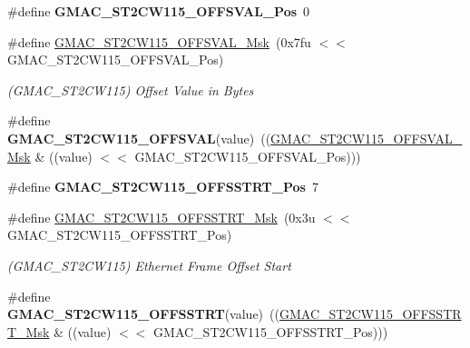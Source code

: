 \begin{DoxyCompactItemize}
\item 
\mbox{\label{group__SAME70__GMAC_ga09c5005c4fdbc41fdffe21a4d8cff012}} 
\#define {\bfseries G\+M\+A\+C\+\_\+\+S\+T2\+C\+W115\+\_\+\+O\+F\+F\+S\+V\+A\+L\+\_\+\+Pos}~0
\item 
\mbox{\label{group__SAME70__GMAC_ga8915a6df60c8f1c436c4851c3bc1a903}} 
\#define \mbox{\hyperlink{group__SAME70__GMAC_ga8915a6df60c8f1c436c4851c3bc1a903}{G\+M\+A\+C\+\_\+\+S\+T2\+C\+W115\+\_\+\+O\+F\+F\+S\+V\+A\+L\+\_\+\+Msk}}~(0x7fu $<$$<$ G\+M\+A\+C\+\_\+\+S\+T2\+C\+W115\+\_\+\+O\+F\+F\+S\+V\+A\+L\+\_\+\+Pos)
\begin{DoxyCompactList}\small\item\em (G\+M\+A\+C\+\_\+\+S\+T2\+C\+W115) Offset Value in Bytes \end{DoxyCompactList}\item 
\mbox{\label{group__SAME70__GMAC_ga343adf63bcdb9618f96d9dec4e4d792f}} 
\#define {\bfseries G\+M\+A\+C\+\_\+\+S\+T2\+C\+W115\+\_\+\+O\+F\+F\+S\+V\+AL}(value)~((\mbox{\hyperlink{group__SAMV71__GMAC_ga8915a6df60c8f1c436c4851c3bc1a903}{G\+M\+A\+C\+\_\+\+S\+T2\+C\+W115\+\_\+\+O\+F\+F\+S\+V\+A\+L\+\_\+\+Msk}} \& ((value) $<$$<$ G\+M\+A\+C\+\_\+\+S\+T2\+C\+W115\+\_\+\+O\+F\+F\+S\+V\+A\+L\+\_\+\+Pos)))
\item 
\mbox{\label{group__SAME70__GMAC_ga6ee2fbe1565cbacf9946df9fb4369632}} 
\#define {\bfseries G\+M\+A\+C\+\_\+\+S\+T2\+C\+W115\+\_\+\+O\+F\+F\+S\+S\+T\+R\+T\+\_\+\+Pos}~7
\item 
\mbox{\label{group__SAME70__GMAC_ga3c64c58bd0a7ba2c85555617269a0cf5}} 
\#define \mbox{\hyperlink{group__SAME70__GMAC_ga3c64c58bd0a7ba2c85555617269a0cf5}{G\+M\+A\+C\+\_\+\+S\+T2\+C\+W115\+\_\+\+O\+F\+F\+S\+S\+T\+R\+T\+\_\+\+Msk}}~(0x3u $<$$<$ G\+M\+A\+C\+\_\+\+S\+T2\+C\+W115\+\_\+\+O\+F\+F\+S\+S\+T\+R\+T\+\_\+\+Pos)
\begin{DoxyCompactList}\small\item\em (G\+M\+A\+C\+\_\+\+S\+T2\+C\+W115) Ethernet Frame Offset Start \end{DoxyCompactList}\item 
\mbox{\label{group__SAME70__GMAC_gaf8bf033e124aa922de6e49d29411a46c}} 
\#define {\bfseries G\+M\+A\+C\+\_\+\+S\+T2\+C\+W115\+\_\+\+O\+F\+F\+S\+S\+T\+RT}(value)~((\mbox{\hyperlink{group__SAMV71__GMAC_ga3c64c58bd0a7ba2c85555617269a0cf5}{G\+M\+A\+C\+\_\+\+S\+T2\+C\+W115\+\_\+\+O\+F\+F\+S\+S\+T\+R\+T\+\_\+\+Msk}} \& ((value) $<$$<$ G\+M\+A\+C\+\_\+\+S\+T2\+C\+W115\+\_\+\+O\+F\+F\+S\+S\+T\+R\+T\+\_\+\+Pos)))

\end{DoxyCompactItemize}
